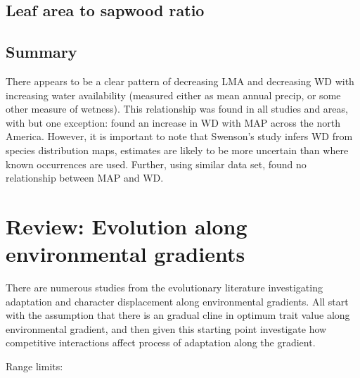 \documentclass[a4paper,11pt]{article}
\begin{document}
\subsection{Leaf area to sapwood ratio}


\subsection{Summary}

There appears to be a clear pattern of decreasing LMA and decreasing WD with increasing water availability (measured either as mean annual precip, or some other measure of wetness). This relationship was found in all studies and areas, with but one exception: \citet{Swenson-2010} found an increase in WD with MAP across the north America. However, it is important to note that Swenson's study infers WD from species distribution maps, estimates are likely to be more uncertain than where known occurrences are used. Further, using similar data set, \citet{Stahl-2015} found no relationship between MAP and WD.


\section{Review: Evolution along environmental gradients}

There are numerous studies from the evolutionary literature investigating adaptation and character displacement along environmental gradients. All start with the assumption that there is an gradual cline in optimum trait value along environmental gradient, and then given this starting point investigate how competitive interactions affect process of adaptation along the gradient.

Range limits:
\end{document}
